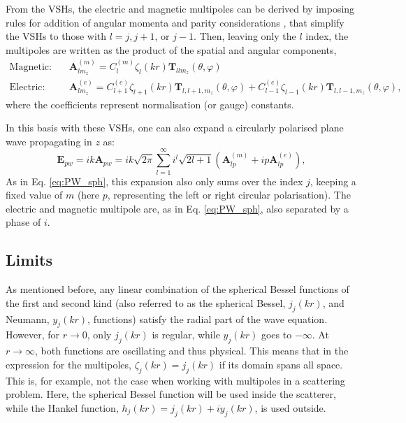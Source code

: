 From the VSHs, the electric and magnetic multipoles can be derived by imposing rules for addition of angular momenta and parity considerations \cite{comparison}, that simplify the VSHs to those with \( l = j, j+1 \), or \( j-1 \). 
Then, leaving only the \( l \) index, the multipoles are written as the product of the spatial and angular components,
\begin{align*}
    \text{Magnetic:}\quad & \mathbf{A}^{(m)}_{lm_z} = C_l^{(m)} \zeta_l(kr) \mathbf{T}_{llm_z}(\theta, \varphi) \\
    \text{Electric:}\quad & \mathbf{A}^{(e)}_{lm_z} = C_{l+1}^{(e)} \zeta_{l+1}(kr) \mathbf{T}_{l,l+1,m_z}(\theta, \varphi) + C_{l-1}^{(e)} \zeta_{l-1}(kr) \mathbf{T}_{l,l-1,m_z}(\theta, \varphi),
\end{align*}
where the coefficients represent normalisation (or gauge) constants.

In this basis with these VSHs, one can also expand a circularly polarised plane wave propagating in \( z \) as:
\begin{equation}\label{eq:rosePW}
    \mathbf{E}_{pw} = ik \mathbf{A}_{pw} = ik \sqrt{2\pi} \sum_{l=1}^{\infty} i^l \sqrt{2l+1} ( \mathbf{A}_{lp}^{(m)} + i p \mathbf{A}_{lp}^{(e)} ),
\end{equation}
As in Eq. \ref{eq:PW_sph}, this expansion also only sums over the index \( j \), keeping a fixed value of \( m \) (here \( p \), representing the left or right circular polarisation). The electric and magnetic multipole are, as in Eq. \ref{eq:PW_sph}, also separated by a phase of \( i \).

\subsection{Limits}
As mentioned before, any linear combination of the spherical Bessel functions of the first and second kind (also referred to as the spherical Bessel, \( j_j(kr) \), and Neumann, \( y_j(kr) \), functions) satisfy the radial part of the wave equation. However, for \( r \to 0 \), only \( j_j(kr) \) is regular, while \( y_j(kr) \) goes to \( -\infty \). At \( r \to \infty \), both functions are oscillating and thus physical. This means that in the expression for the multipoles, \( \zeta_j(kr) = j_j(kr) \) if its domain spans all space. This is, for example, not the case when working with multipoles in a scattering problem. Here, the spherical Bessel function will be used inside the scatterer, while the Hankel function, \( h_j(kr) = j_j(kr) + i y_j(kr) \), is used outside.

